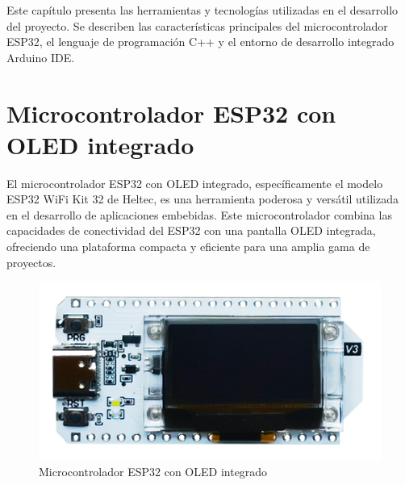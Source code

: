 Este capítulo presenta las herramientas y tecnologías utilizadas en el desarrollo del proyecto. Se describen las características principales del microcontrolador ESP32, el lenguaje de programación C++ y el entorno de desarrollo integrado Arduino IDE.

\section{Microcontrolador ESP32 con OLED integrado}

El microcontrolador ESP32 con OLED integrado, específicamente el modelo ESP32 WiFi Kit 32 de Heltec, es una herramienta poderosa y versátil utilizada en el desarrollo de aplicaciones embebidas. Este microcontrolador combina las capacidades de conectividad del ESP32 con una pantalla OLED integrada, ofreciendo una plataforma compacta y eficiente para una amplia gama de proyectos.


\begin{figure}[!htb]
  \centering
   \includegraphics[width=0.25\linewidth]{figures/esp32heltec.png}
  \caption{Microcontrolador ESP32 con OLED integrado}
  \label{figure:esp32heltec}
\end{figure}
